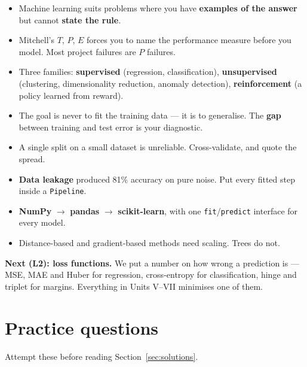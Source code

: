 \documentclass[11pt]{article}
\begin{document}
\begin{itemize}[leftmargin=*]
  \item Machine learning suits problems where you have \textbf{examples of the
    answer} but cannot \textbf{state the rule}.
  \item Mitchell's $T$, $P$, $E$ forces you to name the performance measure
    before you model. Most project failures are $P$ failures.
  \item Three families: \textbf{supervised} (regression, classification),
    \textbf{unsupervised} (clustering, dimensionality reduction, anomaly
    detection), \textbf{reinforcement} (a policy learned from reward).
  \item The goal is never to fit the training data --- it is to generalise. The
    \textbf{gap} between training and test error is your diagnostic.
  \item A single split on a small dataset is unreliable. Cross-validate, and
    quote the spread.
  \item \textbf{Data leakage} produced 81\% accuracy on pure noise. Put every
    fitted step inside a \texttt{Pipeline}.
  \item \textbf{NumPy} $\rightarrow$ \textbf{pandas} $\rightarrow$
    \textbf{scikit-learn}, with one \texttt{fit}/\texttt{predict} interface for
    every model.
  \item Distance-based and gradient-based methods need scaling. Trees do not.
\end{itemize}

\textbf{Next (L2): loss functions.} We put a number on how wrong a prediction
is --- MSE, MAE and Huber for regression, cross-entropy for classification,
hinge and triplet for margins. Everything in Units V--VII minimises one of them.

\newpage
\section{Practice questions}
\label{sec:practice}

Attempt these before reading Section~\ref{sec:solutions}.
\end{document}
